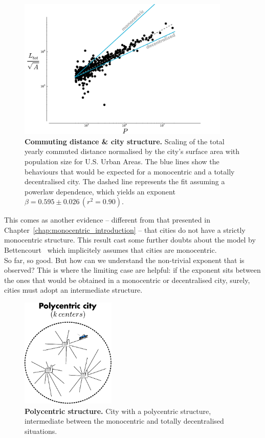 \begin{figure}
    \centering
    \includegraphics[width=0.9\textwidth]{gfx/chapter-scaling/scaling_commuting_norm.pdf}
    \caption{{\bf Commuting distance \& city structure.} Scaling of the total yearly commuted distance normalised by the
    city's surface area with population size for U.S. Urban Areas. The blue lines
show the behaviours that would be expected for a monocentric and a totally
decentralised city. The dashed line represents the fit assuming a powerlaw
dependence, which yields an exponent $\beta =  0.595 \pm 0.026\, (r^2 =
0.90)$.\label{fig:scaling_Ltot_norm}}
    
\end{figure}

This comes as another evidence -- different from that presented in
Chapter~\ref{chap:monocentric_introduction} -- that cities do not have a
strictly monocentric structure. This result cast some further doubts about the
model by Bettencourt~\cite{Bettencourt:2013} which implicitely assumes that
cities are monocentric.\\

So far, so good. But how can we understand the non-trivial exponent that is observed? This is
where the limiting case are helpful: if the exponent sits between the ones that
would be obtained in a monocentric or decentralised city, surely, cities must
adopt an intermediate structure. 

\begin{figure}[!h]
    \centering
    \includegraphics[width=0.4\textwidth]{gfx/chapter-scaling/polycentric.pdf}
    \caption{{\bf Polycentric structure.} City with a polycentric structure, intermediate between the
    monocentric and totally decentralised situations. \label{fig:polycentric}}
\end{figure}

